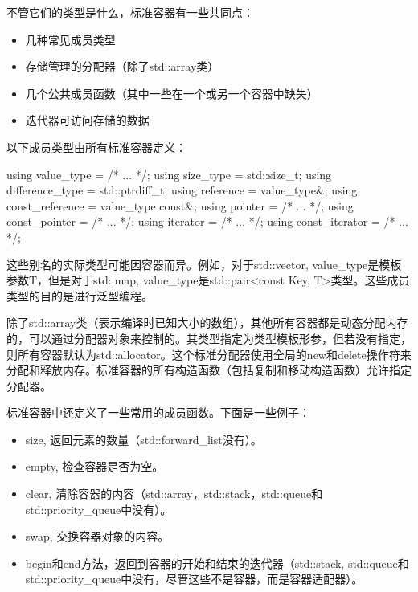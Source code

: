 不管它们的类型是什么，标准容器有一些共同点：

\begin{itemize}
  \item
        几种常见成员类型

  \item
        存储管理的分配器（除了std::array类）

  \item
        几个公共成员函数（其中一些在一个或另一个容器中缺失）

  \item
        迭代器可访问存储的数据
\end{itemize}

以下成员类型由所有标准容器定义：

\begin{cpp}
using value_type = /* ... */;
using size_type = std::size_t;
using difference_type = std::ptrdiff_t;
using reference = value_type&;
using const_reference = value_type const&;
using pointer = /* ... */;
using const_pointer = /* ... */;
using iterator = /* ... */;
using const_iterator = /* ... */;
\end{cpp}

这些别名的实际类型可能因容器而异。例如，对于std::vector, value\_type是模板参数T，但是对于std::map, value\_type是std::pair<const Key, T>类型。这些成员类型的目的是进行泛型编程。

除了std::array类（表示编译时已知大小的数组），其他所有容器都是动态分配内存的，可以通过分配器对象来控制的。其类型指定为类型模板形参，但若没有指定，则所有容器默认为std::allocator。这个标准分配器使用全局的new和delete操作符来分配和释放内存。标准容器的所有构造函数（包括复制和移动构造函数）允许指定分配器。

标准容器中还定义了一些常用的成员函数。下面是一些例子：

\begin{itemize}
  \item
        size, 返回元素的数量（std::forward\_list没有）。

  \item
        empty, 检查容器是否为空。

  \item
        clear, 清除容器的内容（std::array，std::stack，std::queue和std::priority\_queue中没有）。

  \item
        swap, 交换容器对象的内容。

  \item
        begin和end方法，返回到容器的开始和结束的迭代器（std::stack, std::queue和std::priority\_queue中没有，尽管这些不是容器，而是容器适配器）。
\end{itemize}

